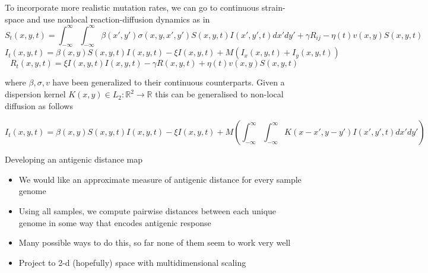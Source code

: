 \documentclass{beamer}
\begin{document}
\begin{frame}{}
    \small
    To incorporate more realistic mutation rates, we can go to continuous strain-space and use nonlocal reaction-diffusion dynamics as in \cite{Rouzine_Rozhnova_2018,Bessonov_Bocharov_Meyerhans_Popov_Volpert_2021}
    \tiny
    \begin{equation}
        S_t(x,y,t) = \int_{-\infty}^{\infty} \int_{-\infty}^{\infty} \beta(x',y') \sigma(x,y,x', y') S(x,y,t) I(x',y',t) dx' dy' + \gamma R_{ij} -  \eta(t) v(x,y) S(x,y,t)\label{Seqn_cts}
    \end{equation}
    \begin{equation}
        I_t(x,y,t) = \beta(x,y) S(x,y,t) I(x,y,t)- \xi I(x,y,t) + M \left(I_x(x,y,t)  + I_y(x,y,t)  \right) \label{Ieqn_cts}    
    \end{equation}
    \begin{equation}
        R_t(x,y,t) = \xi I(x,y,t)I(x,y,t) - \gamma R(x,y,t) + \eta(t) v(x,y) S(x,y,t) \label{Reqn_cts}
    \end{equation}
    
    where $\beta, \sigma, v$ have been generalized to their continuous counterparts. Given a dispersion kernel $K(x,y) \in L_2: \mathbb{R}^2 \to \mathbb{R}$ this can be generalised to non-local diffusion as follows
    
    \begin{equation}
        I_t(x,y,t) = \beta(x,y) S(x,y,t) I(x,y,t)- \xi I(x,y,t) + M \left(\int_{-\infty}^{\infty} \int_{-\infty}^{\infty} K(x-x',y-y')I(x',y',t) dx' dy' \right) \label{Ieqn_cts_nonlocal}    
    \end{equation}
\end{frame}
\begin{frame}{Developing an antigenic distance map}
    \begin{itemize}
        \item We would like an approximate measure of antigenic distance for every sample genome
        \item Using all samples, we compute pairwise distances between each unique genome in some way that encodes antigenic response   
        \item Many possible ways to do this, so far none of them seem to work very well
        \item Project to 2-d (hopefully) space with multidimensional scaling
    \end{itemize}    
\end{frame}
\end{document}
